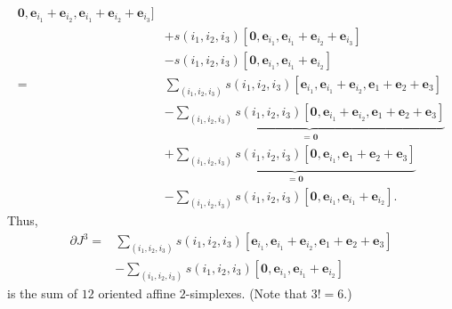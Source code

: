 \documentclass{article}
\begin{document}
\begin{enumerate}
\begin{align*}
        \mathbf{0},
        \mathbf{e}_{i_1}+\mathbf{e}_{i_2},
        \mathbf{e}_{i_1}+\mathbf{e}_{i_2}+\mathbf{e}_{i_3}
      ] \\
      &+ s(i_1, i_2, i_3)[
        \mathbf{0},
        \mathbf{e}_{i_1},
        \mathbf{e}_{i_1}+\mathbf{e}_{i_2}+\mathbf{e}_{i_3}
      ] \\
      &- s(i_1, i_2, i_3)[
        \mathbf{0},
        \mathbf{e}_{i_1},
        \mathbf{e}_{i_1}+\mathbf{e}_{i_2}
      ] \\
    =& \sum_{(i_1,i_2,i_3)} s(i_1, i_2, i_3)
      [
        \mathbf{e}_{i_1},
        \mathbf{e}_{i_1}+\mathbf{e}_{i_2},
        \mathbf{e}_{1}+\mathbf{e}_{2}+\mathbf{e}_{3}
      ] \\
      &- \underbrace{\sum_{(i_1,i_2,i_3)} s(i_1, i_2, i_3) [
        \mathbf{0},
        \mathbf{e}_{i_1}+\mathbf{e}_{i_2},
        \mathbf{e}_{1}+\mathbf{e}_{2}+\mathbf{e}_{3}
      ]}_{= \mathbf{0}} \\
      &+ \underbrace{\sum_{(i_1,i_2,i_3)} s(i_1, i_2, i_3) [
        \mathbf{0},
        \mathbf{e}_{i_1},
        \mathbf{e}_{1}+\mathbf{e}_{2}+\mathbf{e}_{3}
      ]}_{= \mathbf{0}} \\
      &- \sum_{(i_1,i_2,i_3)} s(i_1, i_2, i_3) [
        \mathbf{0},
        \mathbf{e}_{i_1},
        \mathbf{e}_{i_1}+\mathbf{e}_{i_2}
      ].
  \end{align*}
  Thus,
  \begin{align*}
    \partial J^3
    =& \sum_{(i_1,i_2,i_3)} s(i_1, i_2, i_3)
      [
        \mathbf{e}_{i_1},
        \mathbf{e}_{i_1}+\mathbf{e}_{i_2},
        \mathbf{e}_{1}+\mathbf{e}_{2}+\mathbf{e}_{3}
      ] \\
      &- \sum_{(i_1,i_2,i_3)} s(i_1, i_2, i_3) [
        \mathbf{0},
        \mathbf{e}_{i_1},
        \mathbf{e}_{i_1}+\mathbf{e}_{i_2}
      ]
  \end{align*}
  is the sum of $12$ oriented affine $2$-simplexes. (Note that $3! = 6$.)


\end{enumerate}
\end{document}
